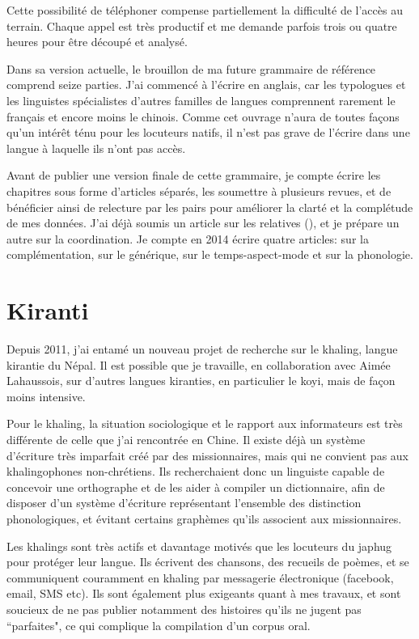 \documentclass[oldfontcommands,oneside,a4paper,11pt]{memoir}
\begin{document}
Cette possibilité de téléphoner compense partiellement la difficulté de l'accès au terrain. Chaque appel est très productif et me demande parfois trois ou quatre heures pour être découpé et analysé.  

Dans sa version actuelle, le brouillon de ma future grammaire de référence comprend seize parties.  J'ai commencé à l'écrire en anglais, car les typologues et les linguistes spécialistes d'autres familles de langues comprennent rarement le français et encore moins le chinois. Comme cet ouvrage n'aura de toutes façons qu'un intérêt ténu pour les locuteurs natifs, il n'est pas grave de l'écrire dans une langue à laquelle ils n'ont pas accès.  

Avant de publier une version finale de cette grammaire, je compte écrire les chapitres sous forme d'articles séparés, les soumettre à plusieurs revues, et de bénéficier ainsi de relecture par les pairs pour améliorer la clarté et la complétude de mes données. J'ai déjà soumis un article sur les relatives (\citet{jacques14relatives}), et je prépare un autre sur la coordination. Je compte en 2014 écrire quatre articles:   sur la complémentation, sur le générique, sur le temps-aspect-mode et sur la phonologie.

\section{Kiranti}
Depuis 2011, j'ai entamé un nouveau projet de recherche sur le khaling, langue kirantie du Népal. Il est possible que je travaille, en collaboration avec Aimée Lahaussois, sur d'autres langues kiranties, en particulier le koyi, mais   de façon moins intensive.

Pour le khaling, la situation sociologique et le rapport aux informateurs est très différente de celle que j'ai rencontrée en Chine. Il existe déjà un système d'écriture très imparfait créé par des missionnaires, mais qui ne convient pas aux khalingophones non-chrétiens. Ils recherchaient donc un linguiste  capable de concevoir une orthographe et de les aider à compiler un dictionnaire, afin de disposer d'un système d'écriture représentant l'ensemble des distinction phonologiques, et évitant certains graphèmes qu'ils associent aux missionnaires. 

Les khalings sont très actifs et davantage motivés que les locuteurs du japhug pour protéger leur langue. Ils écrivent des chansons, des recueils de poèmes, et se communiquent couramment en khaling par messagerie électronique (facebook, email, SMS etc). Ils sont également plus exigeants quant à mes travaux, et sont soucieux de ne pas publier notamment des histoires qu'ils ne jugent pas ``parfaites", ce qui complique la compilation d'un corpus oral.
\end{document}
